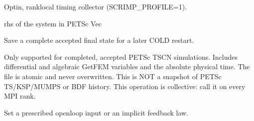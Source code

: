 \documentclass[letterpaper,10pt,english]{sphinxmanual}
\begin{document}
\begin{fulllineitems}

\begin{fulllineitems}
\label{\detokenize{scrimp:scrimp.dphs.DPHS.profiler}}
\pysigstartsignatures
\pysigline
{}
\pysigstopsignatures
\sphinxAtStartPar
Opt\sphinxhyphen{}in, rank\sphinxhyphen{}local timing collector (SCRIMP\_PROFILE=1).

\end{fulllineitems}


\begin{fulllineitems}
\label{\detokenize{scrimp:scrimp.dphs.DPHS.rhs}}
\pysigstartsignatures
\pysigline
{}
\pysigstopsignatures
\sphinxAtStartPar
rhs of the system in PETSc Vec

\end{fulllineitems}


\begin{fulllineitems}
\label{\detokenize{scrimp:scrimp.dphs.DPHS.save_checkpoint}}
\pysigstartsignatures
\pysiglinewithargsret
{}
{\sphinxparamcomma {}\sphinxparamcomma {}}
{}
\pysigstopsignatures
\sphinxAtStartPar
Save a complete accepted final state for a later COLD restart.

\sphinxAtStartPar
Only supported for completed, accepted PETSc TSCN simulations.
Includes differential and algebraic GetFEM variables and the
absolute physical time. The file is atomic and never overwritten.
This is NOT a snapshot of PETSc TS/KSP/MUMPS or BDF history.
This operation is collective: call it on every MPI rank.

\end{fulllineitems}


\begin{fulllineitems}
\label{\detokenize{scrimp:scrimp.dphs.DPHS.set_control}}
\pysigstartsignatures
\pysiglinewithargsret
{}
{\sphinxparamcomma {}}
{}
\pysigstopsignatures
\sphinxAtStartPar
Set a prescribed open\sphinxhyphen{}loop input or an implicit feedback law.


\end{fulllineitems}
\end{fulllineitems}
\end{document}
